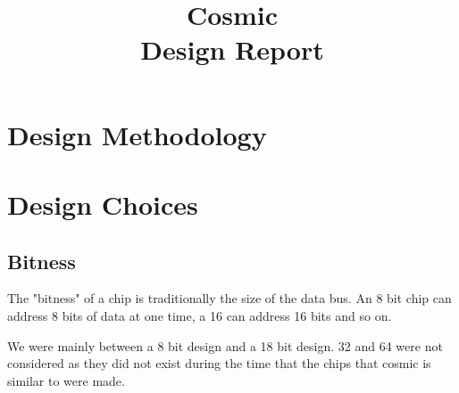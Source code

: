 \documentclass[conference]{IEEEtran}
\begin{document}
\title{
 Cosmic\\Design Report}

\author{
\and
{}

}

\maketitle

\section{Design Methodology}



\section{Design Choices}
\subsection{Bitness}
The "bitness" of a chip is traditionally the size of the data bus. An 8 bit chip can address 8 bits of data at one time, a 16 can address 16 bits and so on.

We were mainly between a 8 bit design and a 18 bit design. 32 and 64 were not considered as they did not exist during the time that the chips that cosmic is similar to were made.\\

\\
\end{document}
